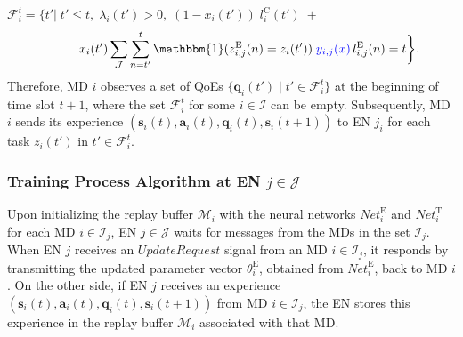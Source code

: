 \documentclass[12pt,draftclsnofoot,onecolumn]{IEEEtran}
\begin{document}
$\mathcal{F}_i^t =\bigg \{ t' \bigg|\; t' \leq t,\; \lambda_i(t')>0, \; (1 - x_i(t')) \; l_i^{\text{C}}(t') \; + $ \vspace{-3mm}
\begin{equation}
	\hspace{10mm} x_i(t')\sum\limits_{\mathcal{J}} \sum\limits_{n= t'}^{t}\mathbbm{1}(z_{i,j}^{\text{E}}(n)=z_i(t'))  \; \textcolor{blue}{y_{i,j}(x)} \, l_{i,j}^{\text{E}}(n) = t \bigg\}.
	\label{27}  
	\nonumber
\end{equation}
Therefore, MD $i$ observes a set of QoEs $\{\boldsymbol{q}_i(t') \mid t' \in \mathcal{F}_i^t\}$ at the beginning of time slot $t+1$, where the set $\mathcal{F}_i^t$ for some $i \in \mathcal{I}$ can be empty. Subsequently, MD $i$ sends its experience $(\boldsymbol{s}_i(t), \boldsymbol{a}_i(t), \boldsymbol{q}_i(t), \boldsymbol{s}_i(t+1))$ to EN $j_i$ for each task $z_i(t')$ in $t' \in \mathcal{F}_i^t$.



\subsubsection{Training Process Algorithm at EN $j \in \mathcal{J}$}
Upon initializing the replay buffer $\mathcal{M}_i$ with the neural networks $\textit{Net}_i^{\text{E}}$ and $\textit{Net}_i^{\text{T}}$ for each MD $i \in \mathcal{I}_j$, EN $j \in \mathcal{J}$ waits for messages from the MDs in the set $\mathcal{I}_j$. When EN $j$ receives an $\textit{UpdateRequest}$ signal from an MD $i \in \mathcal{I}_j$, it responds by transmitting the updated parameter vector $\theta^{\text{E}}_i$, obtained from $\textit{Net}_i^{\text{E}}$, back to MD $i$. On the other side, if EN $j$ receives an experience $(\boldsymbol{s}_i(t), \boldsymbol{a}_i(t), \boldsymbol{q}_i(t), \boldsymbol{s}_i(t+1))$ from MD $i \in \mathcal{I}_j$, the EN stores this experience in the replay buffer $\mathcal{M}_i$ associated with that MD. %
\end{document}

